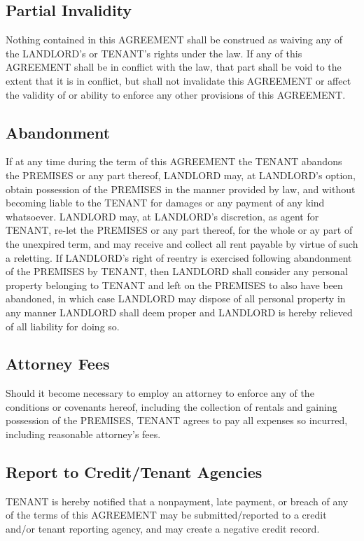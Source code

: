 \documentclass[11pt]{article}
\begin{document}
\subsection{Partial Invalidity}
\label{sec:orgdcf2002}
Nothing contained in this AGREEMENT shall be construed as waiving any
of the LANDLORD's or TENANT's rights under the law.  If any of this
AGREEMENT shall be in conflict with the law, that part shall be void
to the extent that it is in conflict, but shall not invalidate this
AGREEMENT or affect the validity of or ability to enforce any other
provisions of this AGREEMENT.

\subsection{Abandonment}
\label{sec:orgbc57b69}
If at any time during the term of this AGREEMENT the TENANT abandons
the PREMISES or any part thereof, LANDLORD may, at LANDLORD's option,
obtain possession of the PREMISES in the manner provided by law, and
without becoming liable to the TENANT for damages or any payment of any
kind whatsoever.  LANDLORD may, at LANDLORD's discretion, as agent for
TENANT, re-let the PREMISES or any part thereof, for the whole or ay
part of the unexpired term, and may receive and collect all rent
payable by virtue of such a reletting.  If LANDLORD's right of reentry
is exercised following abandonment of the PREMISES by TENANT, then
LANDLORD shall consider any personal property belonging to TENANT and
left on the PREMISES to also have been abandoned, in which case
LANDLORD may dispose of all personal property in any manner LANDLORD
shall deem proper and LANDLORD is hereby relieved of all liability for
doing so.

\subsection{Attorney Fees}
\label{sec:orgdd3a37f}
Should it become necessary to employ an attorney to enforce any of the
conditions or covenants hereof, including the collection of rentals
and gaining possession of the PREMISES, TENANT agrees to pay all
expenses so incurred, including reasonable attorney's fees.

\subsection{Report to Credit/Tenant Agencies}
\label{sec:orgfb5ed05}
TENANT is hereby notified that a nonpayment, late payment, or breach
of any of the terms of this AGREEMENT may be submitted/reported to a
credit and/or tenant reporting agency, and may create a negative
credit record.
\end{document}
